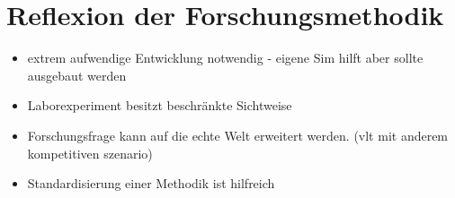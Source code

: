 \section{Reflexion der Forschungsmethodik}

\begin{itemize}
    \item extrem aufwendige Entwicklung notwendig - eigene Sim hilft aber sollte ausgebaut werden
    \item Laborexperiment besitzt beschränkte Sichtweise
    \item Forschungsfrage kann auf die echte Welt erweitert werden. (vlt mit anderem kompetitiven szenario)
    \item Standardisierung einer Methodik ist hilfreich
\end{itemize}
